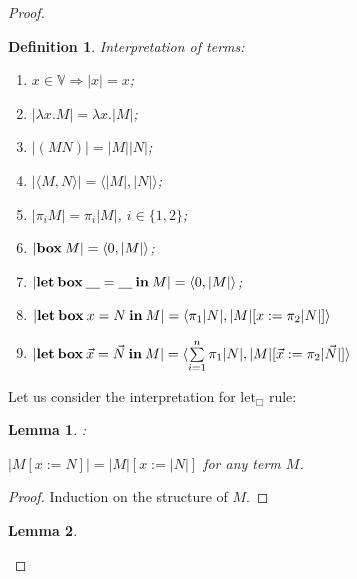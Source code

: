 \documentclass[a4paper]{article}
\newtheorem{lemma}{Lemma}
\newtheorem{defin}{Definition}
\begin{document}
\begin{proof}
  \begin{defin} Interpretation of terms:
    \begin{enumerate}
      \item $x \in \mathbb{V} \Rightarrow |x| = x$;
      \item $|\lambda x. M| = \lambda x. |M|$;
      \item $|(M N)| = |M| |N|$;
      \item $|\langle M, N \rangle| = \langle |M|, |N| \rangle$;
      \item $|\pi_i M| = \pi_i |M|$, $i \in \{ 1, 2\}$;
      \item $|{\bf box \:} M| = \langle 0, |M| \rangle$;
      \item $|{\bf let \: box \:} \underline{\quad} = \underline{\quad} {\: \bf in \:} M| = \langle 0, |M| \rangle$;
      \item $|{\bf let \: box \:} x = N {\: \bf in \:} M| = \langle \pi_1 |N| , |M| [x := \pi_2 |N|] \rangle$
      \item $|{\bf let \: box \:} \vec{x} = \vec{N} {\: \bf in \:} M| = \langle \sum \limits_{i = 1}^n \pi_1 |N|, |M| [\vec{x} := \pi_2 |\vec{N}|] \rangle$
    \end{enumerate}
  \end{defin}

  Let us consider the interpretation for $\text{let}_{\Box}$ rule:

  \begin{prooftree}
  \end{prooftree}

  \begin{lemma}:

    $|M [x := N]| = |M| [x := |N|]$ for any term $M$.
  \end{lemma}

  \begin{proof}

    Induction on the structure of $M$.
  \end{proof}

  \begin{lemma}


\end{lemma}
\end{proof}
\end{document}
